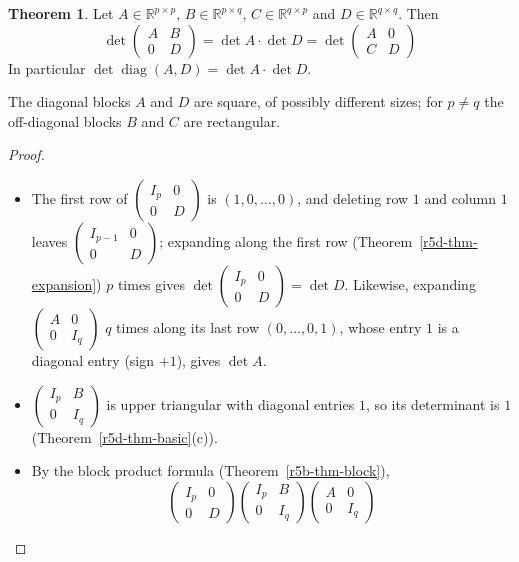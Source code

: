 \documentclass[12pt]{article}
\newcommand{\R}{\mathbb R}
\DeclareMathOperator{\diag}{diag}
\theoremstyle{definition}
\newtheorem{theorem}{Theorem}
\begin{document}
\begin{theorem}\label{r5d-thm-block-tri}
Let \(A\in\R^{p\times p}\), \(B\in\R^{p\times q}\), \(C\in\R^{q\times p}\) and \(D\in\R^{q\times q}\). Then
\[
\det\begin{pmatrix}A&B\\0&D\end{pmatrix}=\det A\cdot\det D=\det\begin{pmatrix}A&0\\C&D\end{pmatrix}
\]
In particular \(\det\diag(A,D)=\det A\cdot\det D\).
\end{theorem}
The diagonal blocks \(A\) and \(D\) are square, of possibly different sizes; for \(p\ne q\) the
off-diagonal blocks \(B\) and \(C\) are rectangular.
\begin{proof}
\begin{itemize}
\item The first row of \(\left(\begin{smallmatrix}I_p&0\\0&D\end{smallmatrix}\right)\) is
\((1,0,\dots,0)\), and deleting row \(1\) and column \(1\) leaves
\(\left(\begin{smallmatrix}I_{p-1}&0\\0&D\end{smallmatrix}\right)\); expanding along the first row (Theorem~\ref{r5d-thm-expansion}) \(p\)
times gives \(\det\left(\begin{smallmatrix}I_p&0\\0&D\end{smallmatrix}\right)=\det D\). Likewise,
expanding \(\left(\begin{smallmatrix}A&0\\0&I_q\end{smallmatrix}\right)\) \(q\) times along its last row
\((0,\dots,0,1)\), whose entry \(1\) is a diagonal entry (sign \(+1\)), gives \(\det A\).
\item \(\left(\begin{smallmatrix}I_p&B\\0&I_q\end{smallmatrix}\right)\) is upper triangular with
diagonal entries \(1\), so its determinant is \(1\) (Theorem~\ref{r5d-thm-basic}(c)).
\item By the block product formula (Theorem~\ref{r5b-thm-block}),
\[
\begin{pmatrix}I_p&0\\0&D\end{pmatrix}\begin{pmatrix}I_p&B\\0&I_q\end{pmatrix}\begin{pmatrix}A&0\\0&I_q\end{pmatrix}
\]
\end{itemize}
\end{proof}
\end{document}
